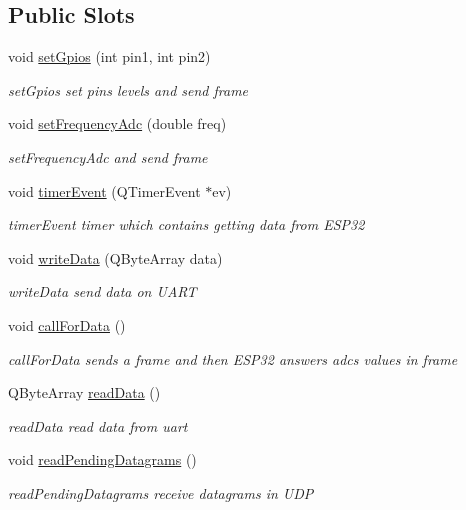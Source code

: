 \subsection*{Public Slots}
\begin{DoxyCompactItemize}
\item 
void \hyperlink{class_e_s_p32data_ad2205a1545fbea3bff74848dc43c4684}{set\+Gpios} (int pin1, int pin2)
\begin{DoxyCompactList}\small\item\em set\+Gpios set pins levels and send frame \end{DoxyCompactList}\item 
void \hyperlink{class_e_s_p32data_aa2716175de492c5de8bb48333eafd9a2}{set\+Frequency\+Adc} (double freq)
\begin{DoxyCompactList}\small\item\em set\+Frequency\+Adc and send frame \end{DoxyCompactList}\item 
void \hyperlink{class_e_s_p32data_a38e856c9f7c5c986fee548ff2e9980a3}{timer\+Event} (Q\+Timer\+Event $\ast$ev)
\begin{DoxyCompactList}\small\item\em timer\+Event timer which contains getting data from E\+S\+P32 \end{DoxyCompactList}\item 
void \hyperlink{class_e_s_p32data_acce7a248a76cc084a78d58aa0b8d18ae}{write\+Data} (Q\+Byte\+Array data)
\begin{DoxyCompactList}\small\item\em write\+Data send data on U\+A\+RT \end{DoxyCompactList}\item 
void \hyperlink{class_e_s_p32data_a50a3a6adc1a17b1d59e57c1ead7b369d}{call\+For\+Data} ()
\begin{DoxyCompactList}\small\item\em call\+For\+Data sends a frame and then E\+S\+P32 answers adcs values in frame \end{DoxyCompactList}\item 
Q\+Byte\+Array \hyperlink{class_e_s_p32data_aacb815132c382980c4d850f099e26ea6}{read\+Data} ()
\begin{DoxyCompactList}\small\item\em read\+Data read data from uart \end{DoxyCompactList}\item 
void \hyperlink{class_e_s_p32data_ab474f90be7784fdc763e78d6bb741c91}{read\+Pending\+Datagrams} ()
\begin{DoxyCompactList}\small\item\em read\+Pending\+Datagrams receive datagrams in U\+DP \end{DoxyCompactList}\end{DoxyCompactItemize}
